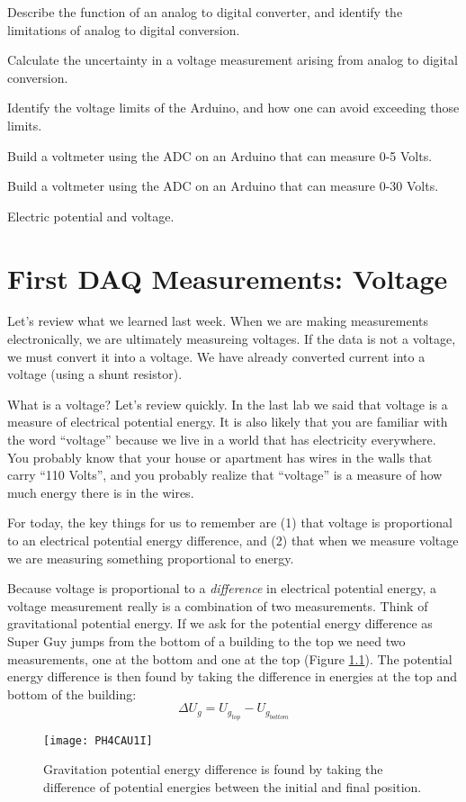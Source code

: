 
\objectives
{
\item Describe the function of an analog to digital converter, and identify the
	limitations of analog to digital conversion.
\item Calculate the uncertainty in a voltage measurement arising from analog
	to digital conversion.
\item Identify the voltage limits of the Arduino, and how one can avoid
	exceeding those limits.
\item Build a voltmeter using the ADC on an Arduino that can measure 0-5 Volts.
\item Build a voltmeter using the ADC on an Arduino that can measure 0-30 Volts.
}

\review
{
\item Electric potential and voltage.
}

\chapter{First DAQ Measurements: Voltage}
Let's review what we learned last week. When we are making measurements
electronically, we are ultimately measureing voltages.
If the data is not a voltage, we must convert it into a
voltage. We have already converted current into a voltage (using a shunt
resistor). 

What is a voltage? Let's review quickly. 
In the last lab we said that voltage is a measure of
electrical potential energy. It is also likely that you are familiar with 
the word ``voltage'' because we live in a world that
has electricity everywhere. You probably know that your house or apartment
has wires in the walls that carry ``110
Volts'', and you probably realize that ``voltage'' 
is a measure of how much energy there is in the
wires.

For today, the key things for us to remember are (1) that voltage 
is proportional to an electrical potential
energy difference, and (2) that when we measure voltage we are
measuring something proportional to energy.

Because voltage is proportional to a \emph{difference} in electrical
potential energy, a voltage measurement really is a combination of two
measurements. Think of gravitational potential energy. If we ask for the
potential energy difference as Super Guy jumps from the bottom of a building
to the top 
we need two measurements, one at
the bottom and one at the top
(Figure \ref{fig:gravitational_energy_difference}). 
The potential energy difference is then found
by taking the difference in energies at the top and bottom of the building:
\begin{equation*}
\Delta U_{g}=U_{g_{top}}-U_{g_{bottom}}
\end{equation*}
\begin{figure}[htbp!]
\centering
\texttt{[image: PH4CAU1I]}
\caption[Gravitational potential energy difference.]{Gravitation potential
energy difference is found by taking the difference of potential energies 
between the initial and final position.}
\label{fig:gravitational_energy_difference}
\end{figure}

